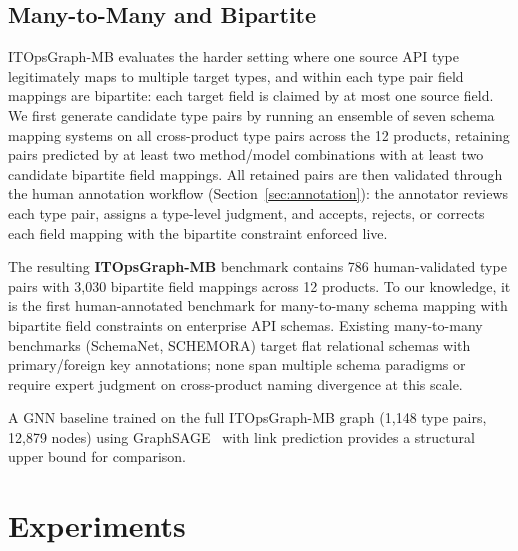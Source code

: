 \documentclass[sigconf, nonacm]{acmart}
\begin{document}
\subsection{Many-to-Many and Bipartite}
\label{sec:itgraph_mb}

ITOpsGraph-MB evaluates the harder setting where one source API type
legitimately maps to multiple target types, and within each type pair
field mappings are bipartite: each target field is claimed by at most
one source field.
We first generate candidate type pairs by running an ensemble of seven
schema mapping systems on all cross-product type pairs across the 12
products, retaining pairs predicted by at least two method/model
combinations with at least two candidate bipartite field mappings.
All retained pairs are then validated through the human annotation
workflow (Section~\ref{sec:annotation}): the annotator reviews each
type pair, assigns a type-level judgment, and accepts, rejects, or
corrects each field mapping with the bipartite constraint enforced live.

The resulting \textbf{ITOpsGraph-MB} benchmark contains 786 human-validated
type pairs with 3,030 bipartite field mappings across 12 products.
To our knowledge, it is the first human-annotated benchmark for
many-to-many schema mapping with bipartite field constraints on
enterprise API schemas. Existing many-to-many benchmarks (SchemaNet,
SCHEMORA) target flat relational schemas with primary/foreign key
annotations; none span multiple schema paradigms or require expert
judgment on cross-product naming divergence at this scale.

A GNN baseline trained on the full ITOpsGraph-MB graph (1,148 type pairs,
12,879 nodes) using GraphSAGE~\cite{hamilton2017inductive} with link
prediction provides a structural upper bound for comparison.

\section{Experiments}
\end{document}
